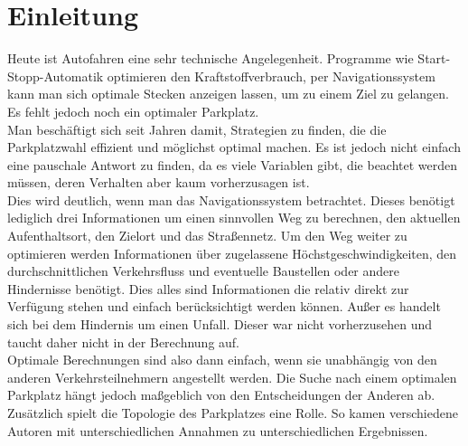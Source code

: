 \section{Einleitung}

Heute ist Autofahren eine sehr technische Angelegenheit. Programme wie Start-Stopp-Automatik optimieren den Kraftstoffverbrauch, per Navigationssystem kann man sich optimale Stecken anzeigen lassen, um zu einem Ziel zu gelangen.\\
Es fehlt jedoch noch ein optimaler Parkplatz.\\
Man beschäftigt sich seit Jahren damit, Strategien zu finden, die die Parkplatzwahl effizient und möglichst optimal machen. Es ist jedoch nicht einfach eine pauschale Antwort zu finden, da es viele Variablen gibt, die beachtet werden müssen, deren Verhalten aber kaum vorherzusagen ist.\\
Dies wird deutlich, wenn man das Navigationssystem betrachtet. Dieses benötigt lediglich drei Informationen um einen sinnvollen Weg zu berechnen, den aktuellen Aufenthaltsort, den Zielort und das Straßennetz. Um den Weg weiter zu optimieren werden Informationen über zugelassene Höchstgeschwindigkeiten, den durchschnittlichen Verkehrsfluss und eventuelle Baustellen oder andere Hindernisse benötigt. Dies alles sind Informationen die relativ direkt zur Verfügung stehen und einfach berücksichtigt werden können. Außer es handelt sich bei dem Hindernis um einen Unfall. Dieser war nicht vorherzusehen und taucht daher nicht in der Berechnung auf.\\
 Optimale Berechnungen sind also dann einfach, wenn sie unabhängig von den anderen Verkehrsteilnehmern angestellt werden. Die Suche nach einem optimalen Parkplatz hängt jedoch maßgeblich von den Entscheidungen der Anderen ab. \\
Zusätzlich spielt die Topologie des Parkplatzes eine Rolle. So kamen verschiedene Autoren mit unterschiedlichen Annahmen zu unterschiedlichen Ergebnissen.\\ %

